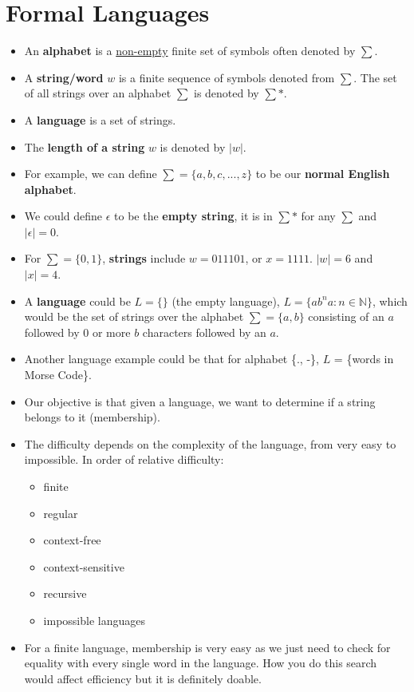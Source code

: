 \documentclass[12pt]{article}
\begin{document}
\section{Formal Languages}
\begin{itemize}
    \item An \textbf{alphabet} is a \underline{non-empty} finite set of symbols often denoted by $\sum$.
    \item A \textbf{string/word} $w$ is a finite sequence of symbols denoted from $\sum$.  The set of all strings over an alphabet $\sum$ is denoted by $\sum*$.
    \item A \textbf{language} is a set of strings.
    \item The \textbf{length of a string} $w$ is denoted by $|w|$.
    \item For example, we can define $\sum = \{a, b, c,..., z\}$ to be our \textbf{normal English alphabet}.
    \item We could define $\epsilon$ to be the \textbf{empty string}, it is in $\sum*$ for any $\sum$ and $|\epsilon| = 0$.  
    \item For $\sum = \{0, 1\}$, \textbf{strings} include $w = 011101$, or $x = 1111$.  $|w| = 6$ and $|x| = 4$.
    \item A \textbf{language} could be $L = \{\}$ (the empty language), $L = \{ab^na : n \in \mathbb{N}\}$, which would be the set of strings over the alphabet $\sum = \{a, b\}$ consisting of an $a$ followed by 0 or more $b$ characters followed by an $a$.
    \item Another language example could be that for alphabet \{., -\}, $L$ = \{words in Morse Code\}.
    \item Our objective is that given a language, we want to determine if a string belongs to it (membership).
    \item The difficulty depends on the complexity of the language, from very easy to impossible.  In order of relative difficulty:
        \begin{itemize}
            \item finite
            \item regular
            \item context-free
            \item context-sensitive
            \item recursive
            \item impossible languages
        \end{itemize}
    \item For a finite language, membership is very easy as we just need to check for equality with every single word in the language.  How you do this search would affect efficiency but it is definitely doable.
\end{itemize}
\end{document}
